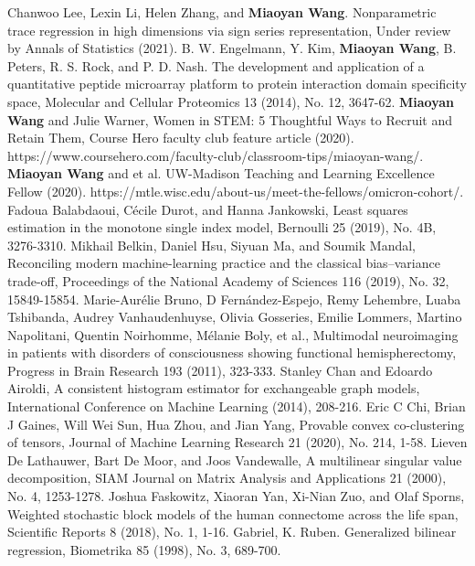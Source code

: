 \documentclass[11pt]{article}
\theoremstyle{exampstyle}
\theoremstyle{definition}
\begin{document}
{\begin{thebibliography}{9}
 Chanwoo Lee, Lexin Li, Helen Zhang, and {\bf Miaoyan Wang}. Nonparametric trace regression in high dimensions via sign series representation, Under review by Annals of Statistics (2021).
 B. W. Engelmann, Y. Kim, {\bf Miaoyan Wang}, B. Peters, R. S. Rock, and P. D. Nash. The development and application of a quantitative peptide microarray platform to protein interaction domain specificity space, Molecular and Cellular Proteomics 13 (2014), No. 12, 3647-62.
 {\bf Miaoyan Wang} and Julie Warner, Women in STEM: 5 Thoughtful Ways to Recruit and Retain Them, Course Hero faculty club feature article (2020). https://www.coursehero.com/faculty-club/classroom-tips/miaoyan-wang/. 
 {\bf Miaoyan Wang} and et al. UW-Madison Teaching and Learning Excellence Fellow (2020). https://mtle.wisc.edu/about-us/meet-the-fellows/omicron-cohort/. 
 Fadoua Balabdaoui, C\'ecile Durot, and Hanna Jankowski, Least squares estimation in the monotone single index model, Bernoulli 25 (2019), No. 4B, 3276-3310.
 Mikhail Belkin, Daniel Hsu, Siyuan Ma, and Soumik Mandal, Reconciling modern machine-learning practice and the classical bias–variance trade-off, Proceedings of the National Academy of Sciences 116 (2019), No. 32, 15849-15854.
 Marie-Aur\'elie Bruno, D Fern\'andez-Espejo, Remy Lehembre, Luaba Tshibanda, Audrey Vanhaudenhuyse, Olivia Gosseries, Emilie Lommers, Martino Napolitani, Quentin Noirhomme, M\'elanie Boly, et al., Multimodal neuroimaging in patients with disorders of consciousness showing functional hemispherectomy, Progress in Brain Research 193 (2011), 323-333.
 Stanley Chan and Edoardo Airoldi, A consistent histogram estimator for exchangeable graph models, International Conference on Machine Learning (2014), 208-216.
 Eric C Chi, Brian J Gaines, Will Wei Sun, Hua Zhou, and Jian Yang, Provable convex co-clustering of tensors, Journal of Machine Learning Research 21 (2020), No. 214, 1-58.
 Lieven De Lathauwer, Bart De Moor, and Joos Vandewalle, A multilinear singular value decomposition, SIAM Journal on Matrix Analysis and Applications 21 (2000), No. 4, 1253-1278.
 Joshua Faskowitz, Xiaoran Yan, Xi-Nian Zuo, and Olaf Sporns, Weighted stochastic block models of the human connectome across the life span, Scientific Reports 8 (2018), No. 1, 1-16.
 Gabriel, K. Ruben. Generalized bilinear regression, Biometrika 85 (1998), No. 3, 689-700.

\end{thebibliography}}
\end{document}
